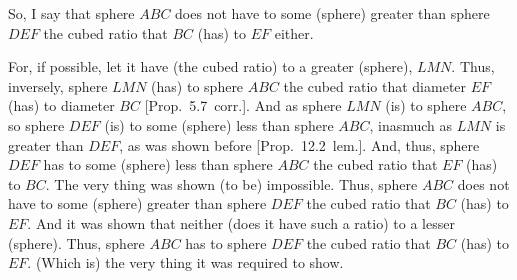 \begin{Parallel}{}{}
{So, I say that sphere $ABC$ does not have to some (sphere) greater than sphere $DEF$ the cubed ratio that
$BC$ (has) to $EF$ either.

For, if possible, let it have (the cubed ratio) to a greater (sphere), $LMN$. Thus, inversely, sphere $LMN$
(has) to sphere $ABC$ the cubed ratio that diameter $EF$ (has) to diameter $BC$ [Prop.~5.7~corr.].
And as sphere $LMN$ (is) to sphere $ABC$, so sphere $DEF$ (is) to some (sphere) less than sphere $ABC$, inasmuch
as  $LMN$ is greater than $DEF$, as was shown before [Prop.~12.2~lem.]. And, thus, sphere
$DEF$ has to some (sphere) less than sphere $ABC$ the cubed ratio that $EF$ (has) to $BC$. The very thing
was shown (to be) impossible. Thus, sphere $ABC$ does not have to some (sphere) greater than sphere $DEF$
the cubed ratio that $BC$ (has) to $EF$. And it was shown that neither (does it have such a ratio) to a lesser
(sphere). Thus, sphere $ABC$ has to sphere $DEF$ the cubed ratio that $BC$ (has) to $EF$. (Which is)
the very thing it was required to show.}
\end{Parallel}